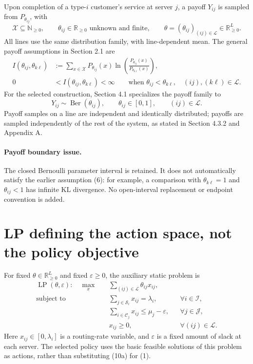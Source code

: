 \documentclass{article}
\begin{document}
Upon completion of a type-$i$ customer's service at server $j$, a payoff $Y_{ij}$ is sampled from $P_{\theta_{ij}}$, with
\[
\mathcal X\subseteq\mathbb N_{\geq0},\qquad
\theta_{ij}\in\mathbb R_{\geq0}\text{ unknown and finite},\qquad
\theta=(\theta_{ij})_{(ij)\in\mathcal L}\in\mathbb R_{\geq0}^{L}.
\]
All lines use the same distribution family, with line-dependent mean. The general payoff assumptions in Section 2.1 are
\begin{align}
I(\theta_{ij},\theta_{k\ell})
&:=\sum_{x\in\mathcal X}P_{\theta_{ij}}(x)
\ln\!\left(\frac{P_{\theta_{ij}}(x)}{P_{\theta_{k\ell}}(x)}\right),\tag{5}\\
0&<I(\theta_{ij},\theta_{k\ell})<\infty
\qquad\text{when }\theta_{ij}<\theta_{k\ell},
\quad (ij),(k\ell)\in\mathcal L.\tag{6}
\end{align}
For the selected construction, Section 4.1 specializes the payoff family to
\[
Y_{ij}\sim\operatorname{Ber}(\theta_{ij}),\qquad
\theta_{ij}\in[0,1],\qquad (ij)\in\mathcal L.
\]
Payoff samples on a line are independent and identically distributed; payoffs are sampled independently of the rest of the system, as stated in Section 4.3.2 and Appendix A.

\paragraph{Payoff boundary issue.}
The closed Bernoulli parameter interval is retained. It does not automatically satisfy the earlier assumption (6): for example, a comparison with $\theta_{k\ell}=1$ and $\theta_{ij}<1$ has infinite KL divergence. No open-interval replacement or endpoint convention is added.

\section*{LP defining the action space, not the policy objective}

For fixed $\theta\in\mathbb R_{\geq0}^{L}$ and fixed $\varepsilon\geq0$, the auxiliary static problem is
\begin{align}
\operatorname{LP}(\theta,\varepsilon):\quad
\max_x\quad&\sum_{(ij)\in\mathcal L}\theta_{ij}x_{ij},\tag{10a}\\
\text{subject to}\quad
&\sum_{j\in\mathcal S_i}x_{ij}=\lambda_i,
&&\forall i\in\mathcal I,\tag{10b}\\
&\sum_{i\in\mathcal C_j}x_{ij}\leq\mu_j-\varepsilon,
&&\forall j\in\mathcal J,\tag{10c}\\
&x_{ij}\geq0,
&&\forall(ij)\in\mathcal L.\tag{10d}
\end{align}
Here $x_{ij}\in[0,\lambda_i]$ is a routing-rate variable, and $\varepsilon$ is a fixed amount of slack at each server. The selected policy uses the basic feasible solutions of this problem as actions, rather than substituting (10a) for (1).
\end{document}
